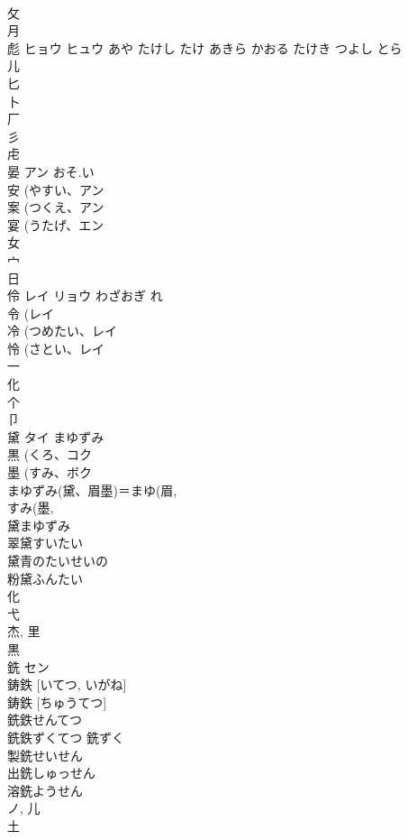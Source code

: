 \documentclass[8pt]{extreport}
\begin{document}
\begin{CJK}{UTF8}{min}
\\	攵 
\\	月 
\\	彪	ヒョウ ヒュウ	あや たけし たけ あきら かおる たけき つよし とら	
\\	儿 
\\	匕 
\\	卜 
\\	厂 
\\	彡 
\\	虍 
\\	晏	アン	おそ.い	
\\	安 (やすい、アン 
\\	案 (つくえ、アン 
\\	宴 (うたげ、エン 
\\	女 
\\	宀 
\\	日 
\\	伶	レイ リョウ	わざおぎ れ	
\\	令 (レイ 
\\	冷 (つめたい、レイ 
\\	怜 (さとい、レイ 
\\	一 
\\	化 
\\	个 
\\	卩 
\\	黛	タイ	まゆずみ	
\\	黒 (くろ、コク 
\\	墨 (すみ、ボク 
\\	まゆずみ(黛、眉墨)＝まゆ(眉, 
\\	すみ(墨, 
\\	黛まゆずみ 
\\	翠黛すいたい 
\\	黛青のたいせいの 
\\	粉黛ふんたい 
\\	化 
\\	弋 
\\	杰, 里 
\\	黒 
\\	銑	セン		
\\	鋳鉄 [いてつ, いがね] 
\\	鋳鉄 [ちゅうてつ] 
\\	銑鉄せんてつ 
\\	銑鉄ずくてつ 銑ずく 
\\	製銑せいせん 
\\	出銑しゅっせん 
\\	溶銑ようせん 
\\	ノ, 儿 
\\	土 

\end{CJK}
\end{document}
